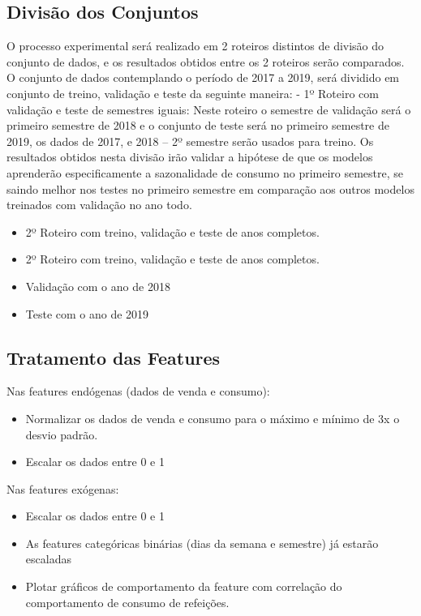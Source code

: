\documentclass[	12pt, Times, openright, twoside, a4paper, english, brazil]{abntex2}
\begin{document}
    	\subsection{Divisão dos Conjuntos}
            O processo experimental será realizado em 2 roteiros distintos de divisão do conjunto de dados, e os resultados obtidos entre os 2 roteiros serão comparados.
            O conjunto de dados contemplando o período de 2017 a 2019, será dividido em conjunto de treino, validação e teste da seguinte maneira: 
            - 1º Roteiro com validação e teste de semestres iguais: 
            Neste roteiro o semestre de validação será o primeiro semestre de 2018 e o conjunto de teste será no primeiro semestre de 2019, os dados de 2017, e 2018 – 2º semestre serão usados para treino. Os resultados obtidos nesta divisão irão validar a hipótese de que os modelos aprenderão especificamente a sazonalidade de consumo no primeiro semestre, se saindo melhor nos testes no primeiro semestre em comparação aos outros modelos treinados com validação no ano todo.
            \begin{itemize}
                    \item 2º Roteiro com treino, validação e teste de anos completos.
                    \item 2º Roteiro com treino, validação e teste de anos completos.
                    \item Validação com o ano de 2018
                    \item Teste com o ano de 2019             
            \end{itemize}
    
            \subsection{Tratamento das Features}
             	Nas features endógenas (dados de venda e consumo):
             	\begin{itemize}
                    \item	Normalizar os dados de venda e consumo para o máximo e mínimo de 3x o desvio padrão. 
                    \item	Escalar os dados entre 0 e 1
                \end{itemize}
                Nas features exógenas:
                \begin{itemize}
                    
                    \item	Escalar os dados entre 0 e 1
                    \item	As features categóricas binárias (dias da semana e semestre) já estarão escaladas
                    \item   Plotar gráficos de comportamento da feature com correlação do comportamento de consumo de refeições.
                \end{itemize}
\end{document}
